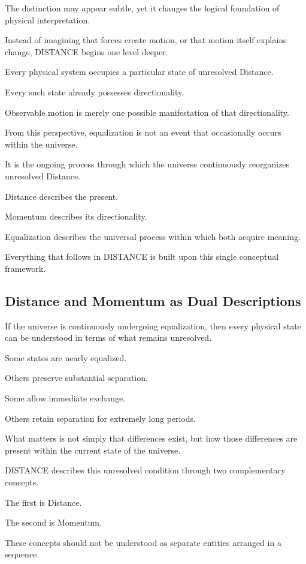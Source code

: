 The distinction may appear subtle, yet it changes the logical foundation of physical interpretation.

Instead of imagining that forces create motion, or that motion itself explains change, DISTANCE begins one level deeper.

Every physical system occupies a particular state of unresolved Distance.

Every such state already possesses directionality.

Observable motion is merely one possible manifestation of that directionality.

From this perspective, equalization is not an event that occasionally occurs within the universe.

It is the ongoing process through which the universe continuously reorganizes unresolved Distance.

Distance describes the present.

Momentum describes its directionality.

Equalization describes the universal process within which both acquire meaning.

Everything that follows in DISTANCE is built upon this single conceptual framework.

\subsection*{\textbf{Distance and Momentum as Dual Descriptions}}

If the universe is continuously undergoing equalization, then every physical state can be understood in terms of what remains unresolved.

Some states are nearly equalized.

Others preserve substantial separation.

Some allow immediate exchange.

Others retain separation for extremely long periods.

What matters is not simply that differences exist, but how those differences are present within the current state of the universe.

DISTANCE describes this unresolved condition through two complementary concepts.

The first is Distance.

The second is Momentum.

These concepts should not be understood as separate entities arranged in a sequence.

